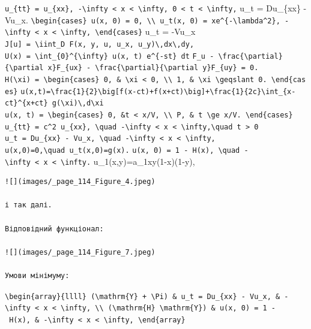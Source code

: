 \documentclass[
  ukrainian,
]{article}
\begin{document}
\texttt{u\_\{tt\}\ =\ u\_\{xx\},\ -\textbackslash{}infty\ \textless{}\ x\ \textless{}\ \textbackslash{}infty,\ 0\ \textless{}\ t\ \textless{}\ \textbackslash{}infty,}
u\_t = Du\_\{xx\} - Vu\_x.
\texttt{\textbackslash{}begin\{cases\}\ u(x,\ 0)\ =\ 0,\ \textbackslash{}\textbackslash{}\ u\_t(x,\ 0)\ =\ xe\^{}\{-\textbackslash{}lambda\^{}2\},\ -\textbackslash{}infty\ \textless{}\ x\ \textless{}\ \textbackslash{}infty,\ \textbackslash{}end\{cases\}}
u\_t = -Vu\_x
\texttt{J{[}u{]}\ =\ \textbackslash{}iint\_D\ F(x,\ y,\ u,\ u\_x,\ u\_y)\textbackslash{},dx\textbackslash{},dy,}
\texttt{U(x)\ =\ \textbackslash{}int\_\{0\}\^{}\{\textbackslash{}infty\}\ u(x,\ t)\ e\^{}\{-st\}\ dt}
\texttt{F\_u\ -\ \textbackslash{}frac\{\textbackslash{}partial\}\{\textbackslash{}partial\ x\}F\_\{ux\}\ -\ \textbackslash{}frac\{\textbackslash{}partial\}\{\textbackslash{}partial\ y\}F\_\{uy\}\ =\ 0.}
\texttt{H(\textbackslash{}xi)\ =\ \textbackslash{}begin\{cases\}\ 0,\ \&\ \textbackslash{}xi\ \textless{}\ 0,\ \textbackslash{}\textbackslash{}\ 1,\ \&\ \textbackslash{}xi\ \textbackslash{}geqslant\ 0.\ \textbackslash{}end\{cases\}}
\texttt{u(x,t)=\textbackslash{}frac\{1\}\{2\}\textbackslash{}big{[}f(x-ct)+f(x+ct)\textbackslash{}big{]}+\textbackslash{}frac\{1\}\{2c\}\textbackslash{}int\_\{x-ct\}\^{}\{x+ct\}\ g(\textbackslash{}xi)\textbackslash{},d\textbackslash{}xi}
\texttt{u(x,\ t)\ =\ \textbackslash{}begin\{cases\}\ 0,\ \&t\ \textless{}\ x/V,\ \textbackslash{}\textbackslash{}\ P,\ \&\ t\ \textbackslash{}ge\ x/V.\ \textbackslash{}end\{cases\}}
\texttt{u\_\{tt\}\ =\ c\^{}2\ u\_\{xx\},\ \textbackslash{}quad\ -\textbackslash{}infty\ \textless{}\ x\ \textless{}\ \textbackslash{}infty,\textbackslash{}quad\ t\ \textgreater{}\ 0}
\texttt{u\_t\ =\ Du\_\{xx\}\ -\ Vu\_x,\ \textbackslash{}quad\ -\textbackslash{}infty\ \textless{}\ x\ \textless{}\ \textbackslash{}infty,}
\texttt{u(x,0)=0,\textbackslash{}quad\ u\_t(x,0)=g(x).}
\texttt{u(x,\ 0)\ =\ 1\ -\ H(x),\ \textbackslash{}quad\ -\textbackslash{}infty\ \textless{}\ x\ \textless{}\ \textbackslash{}infty.}
u\_1(x,y)=a\_1xy(1-x)(1-y),

\begin{verbatim}
![](images/_page_114_Figure_4.jpeg)

і так далі.

Відповідний функціонал:

![](images/_page_114_Figure_7.jpeg)

Умови мінімуму:
\end{verbatim}

\texttt{\textbackslash{}begin\{array\}\{llll\}\ (\textbackslash{}mathrm\{Y\}\ +\ \textbackslash{}Pi)\ \&\ u\_t\ =\ Du\_\{xx\}\ -\ Vu\_x,\ \&\ -\textbackslash{}infty\ \textless{}\ x\ \textless{}\ \textbackslash{}infty,\ \textbackslash{}\textbackslash{}\ (\textbackslash{}mathrm\{H\}\ \textbackslash{}mathrm\{Y\})\ \&\ u(x,\ 0)\ =\ 1\ -\ H(x),\ \&\ -\textbackslash{}infty\ \textless{}\ x\ \textless{}\ \textbackslash{}infty,\ \textbackslash{}end\{array\}}
\end{document}
